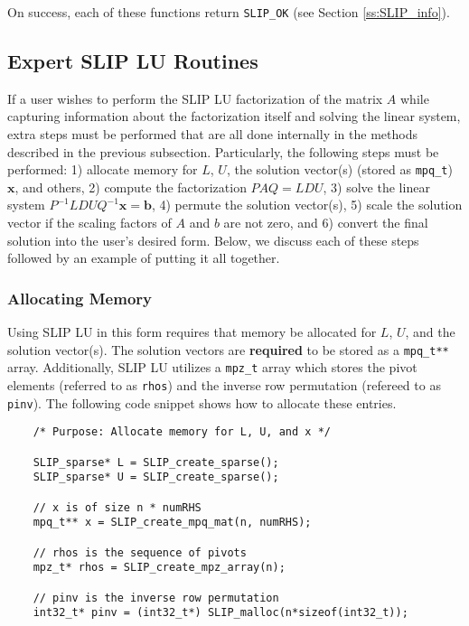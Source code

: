 \documentclass[12pt]{article}
\theoremstyle{definition}
\begin{document}
On success, each of these functions return \verb|SLIP_OK| (see Section
\ref{ss:SLIP_info}).

\cprotect\subsection{Expert SLIP LU Routines}
\label{s:Using:expert}

If a user wishes to perform the SLIP LU factorization of the matrix $A$ while
capturing information about the factorization itself and solving the linear
system, extra steps must be performed that are all done internally in the
methods described in the previous subsection. Particularly, the following steps
must be performed: 1) allocate memory for $L$, $U$, the solution vector(s)
(stored as \verb|mpq_t|) $\mathbf{x}$, and others, 2) compute the factorization
$PAQ = L D U$, 3) solve the linear system $P^{-1} L D U Q^{-1} \mathbf{x} =
\mathbf{b}$, 4) permute the solution vector(s), 5) scale the solution vector if
the scaling factors of $A$ and $b$ are not zero, and 6) convert the final
solution into the user's desired form. Below, we discuss each of these steps
followed by an example of putting it all together.

\subsubsection{Allocating Memory}

Using SLIP LU in this form requires that memory be allocated for $L$, $U$, and
the solution vector(s). The solution vectors are \textbf{required} to be stored
as a \verb|mpq_t**| array. Additionally, SLIP LU utilizes a \verb|mpz_t| array
which stores the pivot elements (referred to as \verb|rhos|) and the inverse
row permutation (refereed to as \verb|pinv|). The following code snippet shows
how to allocate these entries.

    {\small
    \begin{verbatim}
    /* Purpose: Allocate memory for L, U, and x */

    SLIP_sparse* L = SLIP_create_sparse();
    SLIP_sparse* U = SLIP_create_sparse();

    // x is of size n * numRHS
    mpq_t** x = SLIP_create_mpq_mat(n, numRHS);

    // rhos is the sequence of pivots
    mpz_t* rhos = SLIP_create_mpz_array(n);

    // pinv is the inverse row permutation
    int32_t* pinv = (int32_t*) SLIP_malloc(n*sizeof(int32_t)); \end{verbatim}}
\end{document}
